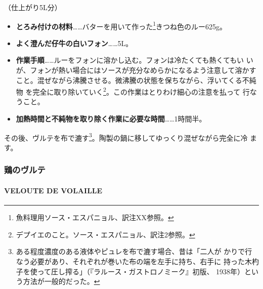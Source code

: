 \documentclass[twoside,12Q,b5j]{escoffierltjsbook}
\begin{document}
 

（仕上がり5L分）

\begin{itemize}
\item
  \textbf{とろみ付けの材料}\ldots{}\ldots{}バターを用いて作った\footnote{魚料理用ソース・エスパニョル、訳注XX参照。}きつね色のルー625g。
\item
  \textbf{よく澄んだ仔牛の白いフォン}\ldots{}\ldots{}5L。
\item
  \textbf{作業手順}\ldots{}\ldots{}ルーをフォンに溶かし込む。フォンは冷たくても熱くてもい
  いが、フォンが熱い場合にはソースが充分なめらかになるよう注意して溶かす
  こと。混ぜながら沸騰させる。微沸騰の状態を保ちながら、浮いてくる不純物
  を完全に取り除いていく\footnote{デプイエのこと。ソース・エスパニョル、訳注2参照。}。この作業はとりわけ細心の注意を払って
  行なうこと。
\item
  \textbf{加熱時間と不純物を取り除く作業に必要な時間}\ldots{}\ldots{}1時間半。
\end{itemize}

その後、ヴルテを布で漉す\footnote{ある程度濃度のある液体やピュレを布で漉す場合、昔は「二人が
  かりで行なう必要があり、それぞれが巻いた布の端を左手に持ち、右手に
  持った木杓子を使って圧し搾る」（『ラルース・ガストロノミーク』初版、
  1938年）という方法が一般的だった。}。陶製の鍋に移してゆっくり混ぜながら完全に冷
ます。

\vspace*{1.7\zw}

\subsubsection{鶏のヴルテ}\label{ux9d8fux306eux30f4ux30ebux30c6}

\paragraph{VELOUTE DE VOLAILLE}\label{veloute-de-volaille}

\end{document}
